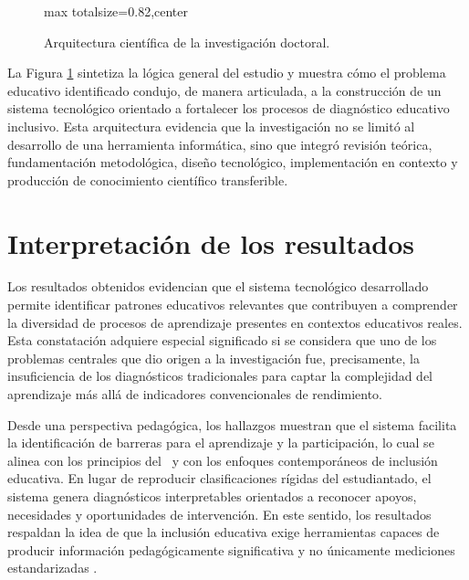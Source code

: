 \begin{refsection}
\begin{figure}[htbp]
\begin{adjustbox}{max totalsize={\textwidth}{0.82\textheight},center}
\end{adjustbox}
\caption{Arquitectura científica de la investigación doctoral.}
\label{fig:arquitectura-cientifica}
\end{figure}

La Figura \ref{fig:arquitectura-cientifica} sintetiza la lógica general del estudio y muestra cómo el problema educativo identificado condujo, de manera articulada, a la construcción de un sistema tecnológico orientado a fortalecer los procesos de diagnóstico educativo inclusivo. Esta arquitectura evidencia que la investigación no se limitó al desarrollo de una herramienta informática, sino que integró revisión teórica, fundamentación metodológica, diseño tecnológico, implementación en contexto y producción de conocimiento científico transferible.

\section{Interpretación de los resultados}

Los resultados obtenidos evidencian que el sistema tecnológico desarrollado permite identificar patrones educativos relevantes que contribuyen a comprender la diversidad de procesos de aprendizaje presentes en contextos educativos reales. Esta constatación adquiere especial significado si se considera que uno de los problemas centrales que dio origen a la investigación fue, precisamente, la insuficiencia de los diagnósticos tradicionales para captar la complejidad del aprendizaje más allá de indicadores convencionales de rendimiento.

Desde una perspectiva pedagógica, los hallazgos muestran que el sistema facilita la identificación de barreras para el aprendizaje y la participación, lo cual se alinea con los principios del \DUA\ y con los enfoques contemporáneos de inclusión educativa. En lugar de reproducir clasificaciones rígidas del estudiantado, el sistema genera diagnósticos interpretables orientados a reconocer apoyos, necesidades y oportunidades de intervención. En este sentido, los resultados respaldan la idea de que la inclusión educativa exige herramientas capaces de producir información pedagógicamente significativa y no únicamente mediciones estandarizadas \parencite{unesco2021}.


\end{refsection}

